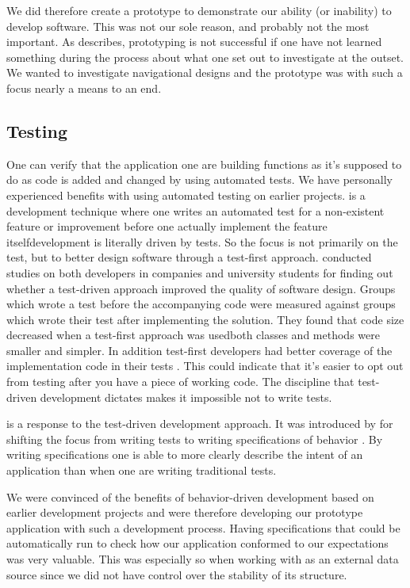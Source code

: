 We did therefore create a prototype to demonstrate our ability (or inability)
to develop software. This was not our sole reason, and probably not the most
important. As \citet[]{mayhew90} describes, prototyping is not
successful if one have not learned something during the process about what one
set out to investigate at the outset. We wanted to investigate navigational
designs and the prototype was with such a focus nearly a means to an end.

\subsection{Testing}
\label{section:implementation.process.testing}

One can verify that the application one are building functions as it's
supposed to do as code is added and changed by using automated tests.
We have personally experienced benefits with using automated testing on
earlier projects.
 is a development technique
where one writes an automated test for a non-existent feature or
improvement before one actually implement the feature itself\dash{}development
is literally driven by tests. So the focus is not primarily on the test, but
to better design software through a test-first approach.
\citet{janzen08} conducted studies
on both developers in companies and university students for finding out
whether a test-driven approach improved the quality of software design.
Groups which wrote a test before the accompanying code were measured
against groups which wrote their test after implementing the solution.
They found that code size decreased when a test-first approach was
used\dash{}both classes and methods were smaller and simpler. In addition
test-first developers had better coverage of the implementation code in
their tests \citep[]{janzen08}. This could indicate that it's
easier to opt out from testing after you have a piece
of working code. The discipline that test-driven development dictates
makes it impossible not to write tests.

 is a response to the test-driven
development approach. It was introduced by \citeauthor{north06} for shifting
the focus from writing tests to writing specifications of behavior
\citep{north06}. By writing specifications one is able to
more clearly describe the intent of an application than when one
are writing traditional tests.

We were convinced of the benefits of behavior-driven development based on
earlier development projects and were therefore developing our
prototype application with such a development process. Having specifications
that could be automatically run to check how our application conformed to our
expectations was very valuable. This was especially so when working
with \urort{} as an external data source since we did not have control over
the stability of its structure.

